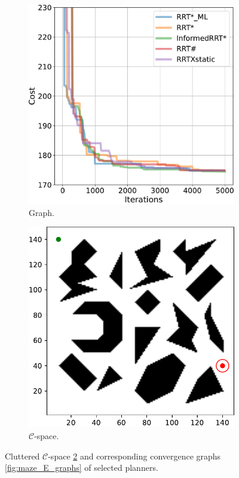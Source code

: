 \documentclass{ctuthesis}
\begin{document}
\begin{figure}[!ht]
  \centering 
  \begin{subfigure}[b]{0.48\textwidth}
    \includegraphics[width=\textwidth]{figChap5/graph_clutter_20pt_ticks.pdf}  
    \caption{Graph.}
    \label{fig:maze_clutter_graphs}
  \end{subfigure}
  \begin{subfigure}[b]{0.49\textwidth}
      \includegraphics[width=\textwidth]{figChap5/Maze_clutter_ticks.pdf}
      \caption{$\mathcal{C}$-space.}
      \label{fig:maze_clutter_Cspace} 
  \end{subfigure}   
  \caption{Cluttered $\mathcal{C}$-space \ref{fig:maze_clutter_Cspace} and 
  corresponding convergence graphs \ref{fig:maze_E_graphs} of selected planners.}
  \label{fig:maze_clutter}
\end{figure}
\end{document}
